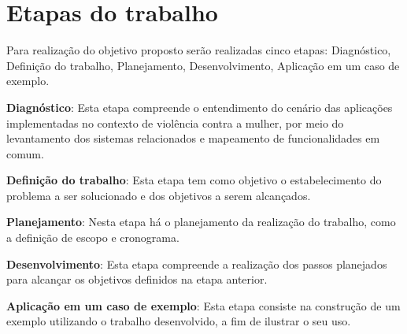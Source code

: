 \section{Etapas do trabalho}

Para realização do objetivo proposto serão realizadas cinco etapas: 
Diagnóstico, Definição do trabalho, Planejamento, Desenvolvimento, Aplicação em um caso de exemplo.

\noindent \textbf{Diagnóstico}: Esta etapa compreende o entendimento do cenário das aplicações implementadas no contexto
de violência contra a mulher, por meio do levantamento dos sistemas relacionados e mapeamento
de funcionalidades em comum.

\noindent \textbf{Definição do trabalho}: Esta etapa tem como objetivo o estabelecimento do problema a ser solucionado e dos objetivos a serem alcançados.

\noindent \textbf{Planejamento}: Nesta etapa há o planejamento da realização do trabalho, como a definição de escopo e cronograma.

\noindent \textbf{Desenvolvimento}: Esta etapa compreende a realização dos passos planejados para 
alcançar os objetivos definidos na etapa anterior.

\noindent \textbf{Aplicação em um caso de exemplo}: Esta etapa consiste na construção de um exemplo utilizando o
trabalho desenvolvido, a fim de ilustrar o seu uso.







